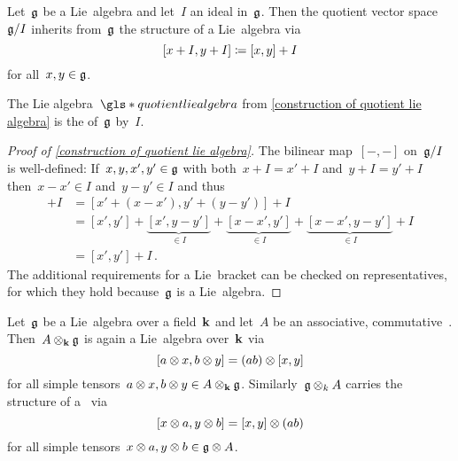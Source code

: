 \begin{lemma}
  \label{construction of quotient lie algebra}
  Let~$\mathfrak{g}$ be a Lie~algebra and let~$I$ an ideal in~$\mathfrak{g}$.
  Then the quotient vector space~$\mathfrak{g}/I$ inherits from~$\mathfrak{g}$ the structure of a Lie~algebra via
  \[
    [x+I, y+I]
    \coloneqq
    [x,y] + I
  \]
  for all~$x, y \in \mathfrak{g}$.
\end{lemma}


\begin{definition}
  The Lie algebra~$\gls*{quotient lie algebra}$ from \cref{construction of quotient lie algebra} is the  of~$\mathfrak{g}$ by~$I$.
\end{definition}



\begin{proof}[Proof of \cref*{construction of quotient lie algebra}]
  The bilinear map~$[-,-]$ on~$\mathfrak{g}/I$ is well-defined:
  If~$x, y, x', y' \in \mathfrak{g}$ with both~$x+I = x'+I$ and~$y+I = y'+I$ then~$x-x' \in I$ and~$y-y' \in I$ and thus
  \begin{align*}
    [x,y] + I
    &=
    [x' + (x-x'), y' + (y-y')] + I \\
    &=
    [x',y']
    + \underbrace{[x', y-y']}_{\in I}
    + \underbrace{[x-x', y']}_{\in I}
    + \underbrace{[x-x', y-y']}_{\in I}
    + I
    \\
    &=
    [x', y'] + I  \,.
  \end{align*}
  The additional requirements for a Lie~bracket can be checked on representatives, for which they hold because~$\mathfrak{g}$ is a Lie~algebra.
\end{proof}


\begin{lemma}
  \label{quasi extension of scalars for lie algebras}
  Let~$\mathfrak{g}$ be a Lie~algebra over a field~$\kf$ and let~$A$ be an associative, commutative~{\algebra{$\kf$}}.
  Then~$A \otimes_{\mathbf{k}} \mathfrak{g}$ is again a Lie~algebra over~$\kf$ via
  \[
    [a \otimes x, b \otimes y]
    =
    (ab) \otimes [x,y]
  \]
  for all simple tensors~$a \otimes x, b \otimes y \in A \otimes_{\mathbf{k}} \mathfrak{g}$.
  Similarly~$\mathfrak{g} \otimes_k A$ carries the structure of a~{\liealgebra{$\kf$}} via
  \[
    [x \otimes a, y \otimes b]
    =
    [x,y] \otimes (ab)
  \]
  for all simple tensors~$x \otimes a, y \otimes b \in \mathfrak{g} \otimes A$.
\end{lemma}


